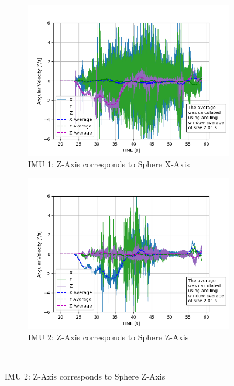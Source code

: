 \begin{figure}
\centering
\begin{subfigure}{0.45\textwidth}
\includegraphics[width=\textwidth]{./plotsAndScripts/angVel-2020-01-29-16-14-54/imu1_ang_vel}
\caption{IMU 1: Z-Axis corresponds to Sphere X-Axis}
\label{sec:technicalApproach:fig:imu1_ang_vel}
\end{subfigure}\hfill
\begin{subfigure}{0.45\textwidth}
\includegraphics[width=\textwidth]{./plotsAndScripts/angVel-2020-01-29-16-14-54/imu2_ang_vel}
\caption{IMU 2: Z-Axis corresponds to Sphere Z-Axis}
\label{sec:technicalApproach:fig:imu2_ang_vel}
\end{subfigure}\hfill\\


\end{figure}
